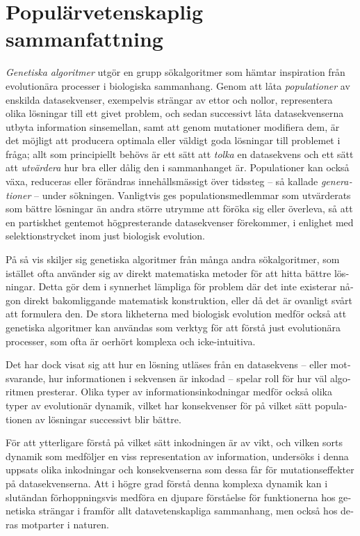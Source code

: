 \documentclass[a4paper,12pt]{article}
\theoremstyle{plain}
\theoremstyle{definition}
\begin{document}
\section*{Populärvetenskaplig sammanfattning}
\begin{otherlanguage}{swedish}
   \thispagestyle{empty} %
   \textit{Genetiska algoritmer} utgör en grupp sökalgoritmer som
   hämtar inspiration från evolutionära processer i biologiska sammanhang. Genom
   att låta \textit{populationer} av enskilda datasekvenser, exempelvis strängar av
   ettor och nollor, representera olika
   lösningar till ett givet problem, och sedan successivt låta datasekvenserna
   utbyta information sinsemellan, samt att genom mutationer modifiera dem, är det möjligt att 
   producera optimala eller väldigt goda lösningar till problemet i fråga; allt 
   som principiellt behövs är ett sätt att \textit{tolka} en datasekvens och ett sätt 
   att \textit{utvärdera} hur bra eller dålig den i sammanhanget är. Populationer
   kan också växa, reduceras eller förändras innehållsmässigt över tidssteg -- så
   kallade \textit{generationer} -- under sökningen.
   Vanligtvis ges populationsmedlemmar som utvärderats som bättre lösningar än
   andra större utrymme att föröka sig eller överleva, så att en partiskhet gentemot
   högpresterande datasekvenser förekommer, i enlighet med selektionstrycket
   inom just biologisk evolution.

   På så vis skiljer sig genetiska algoritmer från många andra sökalgoritmer, 
   som istället ofta använder sig av direkt matematiska metoder för att hitta 
   bättre lösningar. Detta gör dem i synnerhet lämpliga för problem där det inte existerar någon
   direkt bakomliggande matematisk konstruktion, eller då det är ovanligt
   svårt att formulera den. De stora likheterna med biologisk evolution medför
   också att genetiska algoritmer kan användas som verktyg för att förstå just
   evolutionära processer, som ofta är oerhört komplexa och icke-intuitiva. 

   Det har dock visat sig att hur en lösning utläses från en datasekvens --
   eller motsvarande, hur informationen i sekvensen är inkodad -- spelar
   roll för hur väl algoritmen presterar. Olika typer av informationsinkodningar
   medför också olika typer av evolutionär dynamik, vilket har konsekvenser för på
   vilket sätt populationen av lösningar successivt blir bättre. 
   
   För att ytterligare förstå på vilket sätt inkodningen är av vikt, och vilken sorts
   dynamik som medföljer en viss representation av information, undersöks i
   denna uppsats olika inkodningar och konsekvenserna som dessa får för
   mutationseffekter på datasekvenserna. Att i högre 
   grad förstå denna komplexa dynamik kan i slutändan förhoppningsvis medföra en djupare 
   förståelse för funktionerna hos genetiska strängar i framför allt datavetenskapliga
   sammanhang, men också hos deras motparter i naturen.
\end{otherlanguage}
\newpage
   \thispagestyle{empty} 
   \tableofcontents
\newpage
\setcounter{page}{1}
\end{document}

